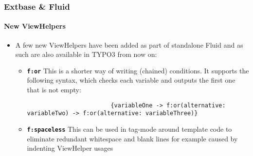 \begin{frame}[fragile]
	\frametitle{Extbase \& Fluid}
	\framesubtitle{New ViewHelpers}

	\lstset{basicstyle=\tiny\ttfamily}

	\begin{itemize}
		\item A few new ViewHelpers have been added as part of standalone Fluid
			and as such are also available in TYPO3 from now on:

			\begin{itemize}

				\item \textbf{\texttt{f:or}}\newline
					This is a shorter way of writing (chained) conditions.
					It supports the following syntax, which checks each variable
					and outputs the first one that is not empty:

					\begin{lstlisting}
						{variableOne -> f:or(alternative: variableTwo) -> f:or(alternative: variableThree)}
					\end{lstlisting}

				\item \textbf{\texttt{f:spaceless}}\newline
					This can be used in tag-mode around template code to
					eliminate redundant whitespace and blank lines for example
					caused by indenting ViewHelper usages

			\end{itemize}

	\end{itemize}

\end{frame}


